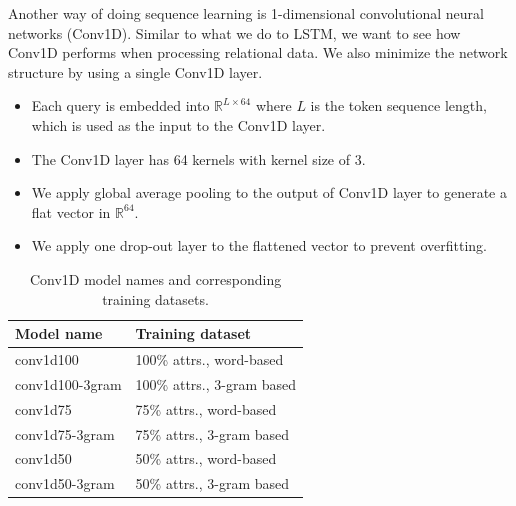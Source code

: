 \documentclass[conference]{IEEEtran}
\begin{document}

Another way of doing sequence learning is 1-dimensional convolutional neural networks (Conv1D). Similar to what we do to LSTM, we want to see how Conv1D performs when processing relational data. We also minimize the network structure by using a single Conv1D layer.


\begin{itemize}
	\item Each query is embedded into $\mathbb{R}^{L\times 64}$ where $L$ is the token sequence length, which is used as the input to the Conv1D layer.
	\item The Conv1D layer has 64 kernels with kernel size of 3.
	\item We apply global average pooling to the output of Conv1D layer to generate a flat vector in $\mathbb{R}^{64}$.
	\item We apply one drop-out layer to the flattened vector to prevent overfitting.
\end{itemize}

\begin{table}[!th]
	\centering
	\begin{tabularx}{0.8\textwidth}{|l|X|}
		\hline
		\textbf{Model name} & \textbf{Training dataset} \\ \hline
		conv1d100 & 100\% attrs., word-based \\
		conv1d100-3gram & 100\% attrs., 3-gram based \\ 
		conv1d75 & 75\% attrs., word-based \\
		conv1d75-3gram & 75\% attrs., 3-gram based \\ 
		conv1d50 & 50\% attrs., word-based \\
		conv1d50-3gram & 50\% attrs., 3-gram based \\ 
		\hline
	\end{tabularx}
	\caption{Conv1D model names and corresponding training datasets.}
	\label{tab:trained_conv1d_models}
\end{table}

\end{document}
